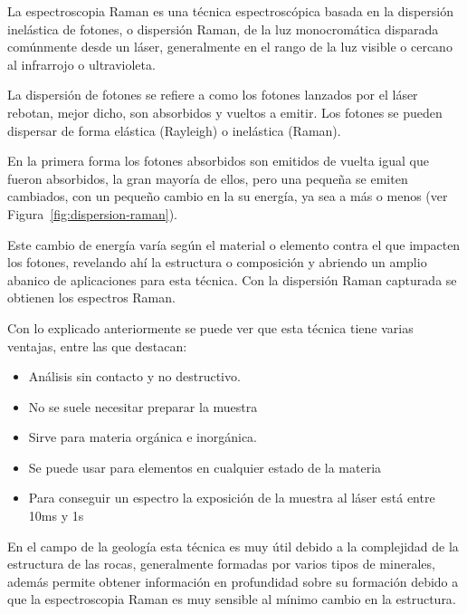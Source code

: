 
La espectroscopia Raman es una técnica espectroscópica basada en la dispersión
inelástica de fotones, o dispersión Raman, de la luz monocromática disparada
comúnmente desde un láser\cite{raman-basics}, generalmente en el rango de la luz
visible o cercano al infrarrojo o ultravioleta\cite{wiki:raman-en}.

La dispersión de fotones se refiere a como los fotones lanzados por el láser
rebotan, mejor dicho, son absorbidos y vueltos a emitir. Los fotones se pueden
dispersar de forma elástica (Rayleigh) o inelástica (Raman).

En la primera forma los fotones absorbidos son emitidos de vuelta igual que
fueron absorbidos, la gran mayoría de ellos, pero una pequeña se emiten
cambiados, con un pequeño cambio en la su energía, ya sea a más o menos (ver
Figura~\ref{fig:dispersion-raman}).

Este cambio de energía varía según el material o elemento contra el que impacten
los fotones, revelando ahí la estructura o composición y abriendo un amplio
abanico de aplicaciones para esta
técnica\cite{what-is-raman,wiki:raman-scatter}. Con la dispersión Raman
capturada se obtienen los espectros Raman.


Con lo explicado anteriormente se puede ver que esta técnica tiene varias
ventajas, entre las que destacan\cite{what-is-raman}:
\begin{itemize}
	\tightlist
	\item Análisis sin contacto y no destructivo.
	\item No se suele necesitar preparar la muestra
	\item Sirve para materia orgánica e inorgánica.
	\item Se puede usar para elementos en cualquier estado de la materia
	\item Para conseguir un espectro la exposición de la muestra al láser está
	entre 10ms y 1s
	
\end{itemize}

En el campo de la geología esta técnica es muy útil debido a la complejidad de
la estructura de las rocas, generalmente formadas por varios tipos de minerales,
además permite obtener información en profundidad sobre su formación debido a
que la espectroscopia Raman es muy sensible al mínimo cambio en la
estructura\cite{quora:raman-geology}.


